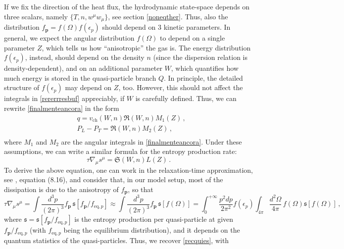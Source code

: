 \documentclass[a4paper, amsfonts, amssymb, amsmath, reprint, showkeys, nofootinbib, twoside, onecolumn, notitlepage]{revtex4-1}
\begin{document}
If we fix the direction of the heat flux, the hydrodynamic state-space depends on three scalars, namely $\{T,n,w^\mu w_\mu\}$, see section \ref{noneqther}. Thus, also the distribution $f_{\textbf{p}}=f(\Omega)f(\epsilon_p)$ should depend on 3 kinetic parameters. In general, we expect the angular distribution $f(\Omega)$ to depend on a single parameter $Z$, which tells us how ``anisotropic'' the gas is. The energy distribution $f(\epsilon_p)$, instead, should depend on the density $n$ (since the dispersion relation is density-dependent), and on an additional parameter $W$, which quantifies how much energy is stored in the quasi-particle branch $Q$. In principle, the detailed structure of $f(\epsilon_p)$ may depend on $Z$, too. However, this should not affect the integrals in \eqref{rererrresbuf} appreciably, if $W$ is carefully defined. Thus, we can rewrite \eqref{finalmenteancora} in the form
\begin{equation}\label{nonancora}
    \begin{split}
& q= v_{\text{ch}}(W,n)\mathfrak{R}(W,n)M_1(Z) \, , \\
& P_L-P_T = \mathfrak{R}(W,n)M_2(Z) \, , \\
    \end{split}
\end{equation}
where $M_1$ and $M_2$ are the angular integrals in \eqref{finalmenteancora}. Under these assumptions, we can write a similar formula for the entropy production rate:
\begin{equation}\label{recquies}
    \tau \nabla_\mu s^\mu = \mathfrak{S}(W,n)L(Z) \, .
\end{equation}
To derive the above equation, one can work in the relaxation-time approximation, see \cite{cercignani_book}, equation (8.16), and consider that, in our model setup, most of the dissipation is due to the anisotropy of $f_{\textbf{p}}$, so that
\begin{equation}
    \tau \nabla_\mu s^\mu = \int \dfrac{d^3 p}{(2\pi)^3} f_{\textbf{p}} \, \mathfrak{s}[f_{\textbf{p}}/f_{\text{eq},p}] \approx \int \dfrac{d^3 p}{(2\pi)^3} f_{\textbf{p}} \, \mathfrak{s}[f(\Omega)] = \int_{0}^{+\infty} \dfrac{p^2 dp}{2\pi^2} f(\epsilon_p)\int_{4\pi} \dfrac{d^2 \Omega}{4\pi} \, f(\Omega)\mathfrak{s}[f(\Omega)]  \, ,
\end{equation}
where $\mathfrak{s}=\mathfrak{s}[f_{\textbf{p}}/f_{\text{eq},p}]$ is the entropy production per quasi-particle at given $f_{\textbf{p}}/f_{\text{eq},p}$ (with $f_{\text{eq},p}$ being the equilibrium distribution), and it depends on the quantum statistics of the quasi-particles. Thus, we recover \eqref{recquies}, with
\end{document}
